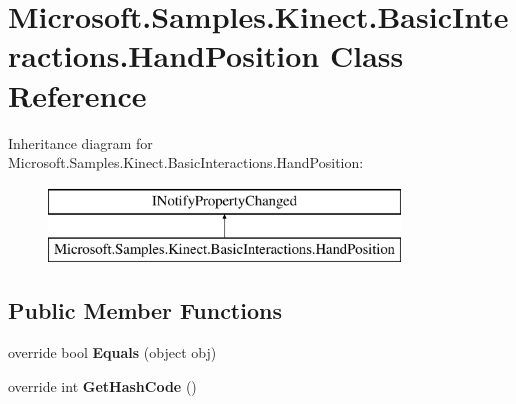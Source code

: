 \hypertarget{class_microsoft_1_1_samples_1_1_kinect_1_1_basic_interactions_1_1_hand_position}{\section{Microsoft.\-Samples.\-Kinect.\-Basic\-Interactions.\-Hand\-Position Class Reference}
\label{class_microsoft_1_1_samples_1_1_kinect_1_1_basic_interactions_1_1_hand_position}
}
Inheritance diagram for Microsoft.\-Samples.\-Kinect.\-Basic\-Interactions.\-Hand\-Position\-:\begin{figure}[H]
\begin{center}
\leavevmode
\includegraphics[height=2.000000cm]{class_microsoft_1_1_samples_1_1_kinect_1_1_basic_interactions_1_1_hand_position}
\end{center}
\end{figure}
\subsection*{Public Member Functions}
\begin{DoxyCompactItemize}
\item 
\hypertarget{class_microsoft_1_1_samples_1_1_kinect_1_1_basic_interactions_1_1_hand_position_a8b904b8e1de4c3aad0a9fafe55e8b7aa}{override bool {\bfseries Equals} (object obj)}\label{class_microsoft_1_1_samples_1_1_kinect_1_1_basic_interactions_1_1_hand_position_a8b904b8e1de4c3aad0a9fafe55e8b7aa}

\item 
\hypertarget{class_microsoft_1_1_samples_1_1_kinect_1_1_basic_interactions_1_1_hand_position_a6a7b2fc015d93d5c9272bec13fccd939}{override int {\bfseries Get\-Hash\-Code} ()}\label{class_microsoft_1_1_samples_1_1_kinect_1_1_basic_interactions_1_1_hand_position_a6a7b2fc015d93d5c9272bec13fccd939}

\end{DoxyCompactItemize}
